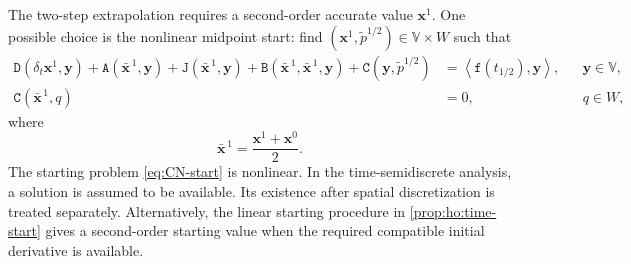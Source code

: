 \documentclass[11pt,a4paper]{article}
\newcommand{\bs}{\boldsymbol}
\newcommand{\V}{\mathbb V}
\newcommand{\DD}{\mathtt D}
\newcommand{\Aform}{\mathtt A}
\newcommand{\JJ}{\mathtt J}
\newcommand{\BB}{\mathtt B}
\newcommand{\CC}{\mathtt C}
\newcommand{\ff}{\mathtt f}
\newcommand{\pp}{\widetilde p}
\newcommand{\dual}[2]{\left\langle#1,#2\right\rangle}
\theoremstyle{definition}
\numberwithin{equation}{section}
\begin{document}
The two-step extrapolation requires a second-order accurate value
\(\bs x^1\). One possible choice is the nonlinear midpoint start:
find \((\bs x^1,\pp^{1/2})\in\V\times W\) such that
\begin{equation}\label{eq:CN-start}
\begin{aligned}
 \DD(\delta_t\bs x^1,\bs y)
 +\Aform(\bar{\bs x}^{\,1},\bs y)
 +\JJ(\bar{\bs x}^{\,1},\bs y)
 +\BB(\bar{\bs x}^{\,1},\bar{\bs x}^{\,1},\bs y)
 +\CC(\bs y,\pp^{1/2})
 &=
 \dual{\ff(t_{1/2})}{\bs y},
 &&\bs y\in\V,\\
 \CC(\bar{\bs x}^{\,1},q)&=0,
 &&q\in W,
\end{aligned}
\end{equation}
where
\[
 \bar{\bs x}^{\,1}
 =
 \frac{\bs x^1+\bs x^0}{2}.
\]
The starting problem \eqref{eq:CN-start} is nonlinear. In the
time-semidiscrete analysis, a solution is assumed to be available.
Its existence after spatial discretization is treated separately.
Alternatively, the linear starting procedure in
\cref{prop:ho:time-start} gives a second-order starting value when the
required compatible initial derivative is available.
\end{document}
